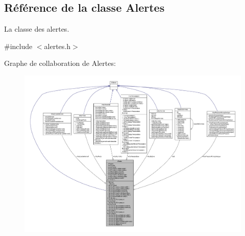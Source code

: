 \hypertarget{class_alertes}{}\subsection{Référence de la classe Alertes}
\label{class_alertes}


La classe des alertes.  




{\ttfamily \#include $<$alertes.\+h$>$}



Graphe de collaboration de Alertes\+:\nopagebreak
\begin{figure}[H]
\begin{center}
\leavevmode
\includegraphics[width=350pt]{class_alertes__coll__graph}
\end{center}
\end{figure}
